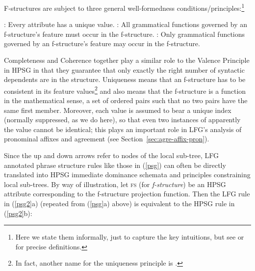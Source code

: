 \noindent
F-structures are subject to three general well-formedness conditions/principles:\footnote{Here we state them informally, just to capture the key intuitions, but see \citet[37 (reprint pagination)]{KB82a-u} or \citet[52--53]{dalrymple;ea19} for precise definitions.}%
%
\begin{exe}
  \ex {}: 
Every attribute has a unique value.
\ex {}: All grammatical functions governed by an f-structure's  feature must occur in the f-structure. 
  \ex {}: Only grammatical functions governed by an f-structure's  feature may occur in the f-structure.
\end{exe}
%
Completeness and Coherence together play a similar role to the Valence Principle in HPSG \citep[348]{ps2} in that they guarantee that only exactly the right number of syntactic dependents are in the structure.  Uniqueness means that an f-structure has to be consistent in its feature values\footnote{In fact, another name for the uniqueness principle is  \citep[53]{dalrymple;ea19}.} and also means that the f-structure is a function in the mathematical sense, a set of ordered pairs such that no two pairs have the same first member. Moreover, each  value is assumed to bear a unique index (normally suppressed, as we do here), so that even two instances of apparently the   value cannot be identical; this plays an important role in LFG's analysis of pronominal affixes and agreement (see Section~\ref{sec:agre-affix-pron}).


Since the up and down arrows refer to nodes of the local sub-tree, LFG annotated phrase structure rules like those in (\ref{psg}) can often be directly translated into HPSG immediate dominance schemata and principles constraining local sub-trees.  
By way of illustration, let \textsc{fs} (for \textit{f-structure}) be an HPSG attribute corresponding to the f-structure projection function.  Then the LFG rule in (\ref{psg2}a) (repeated from (\ref{psg}a) above) is equivalent to the  HPSG rule in (\ref{psg2}b):

\eal 
 \label{psg2}
\ex
\label{psg2a}
{
}
               
\ex
\label{psg2b} 
{
}
\zl


